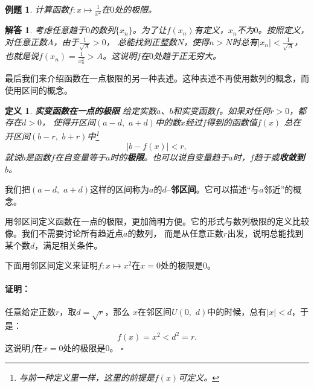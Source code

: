 \documentclass[12pt,UTF8]{ctexbook}
\newtheorem{df}{定义}[section]
\newtheorem{et}{例题}[section]
\newtheorem*{so}{解答}
\renewenvironment{proof}{\paragraph{\textbf{证明：}}}{\hfill$\square$}
\begin{document}
\begin{et}
    计算函数$f: x\mapsto \frac{1}{x^2}$在$0$处的极限。
\end{et}
\begin{so}
    考虑任意趋于$0$的数列$\{x_n\}$。为了让$f(x_n)$有定义，$x_n$不为$0$。按照定义，对任意正数$A$，由于$\frac{1}{\sqrt{A}} > 0$，
    总能找到正整数$N$，使得$n>N$时总有$|x_n| < \frac{1}{\sqrt{A}}$，也就是说$f(x_n) = \frac{1}{x_n^2} > A$。这说明$f$在$0$处趋于正无穷大。
\end{so}

最后我们来介绍函数在一点极限的另一种表述。这种表述不再使用数列的概念，而使用区间的概念。

\begin{df}\textbf{实变函数在一点的极限}
    给定实数$a$、$b$和实变函数$f$。如果对任何$r>0$，都存在$d>0$，
    使得开区间$(a-d,\,\,a+d)$中的数$x$经过$f$得到的函数值$f(x)$
    总在开区间$(b-r,\,\,b+r)$中\footnote{与前一种定义里一样，这里的前提是$f(x)$可定义。}
    $$ |b - f(x)| < r,$$
    就说$b$是函数$f$在自变量等于$a$时的\textbf{极限}。也可以说自变量趋于$a$时，$f$趋于或\textbf{收敛到} $b$。
\end{df}

我们把$(a-d,\,\,a+d)$这样的区间称为$a$的$d$–\textbf{邻区间}。它可以描述“与$a$邻近”的概念。

用邻区间定义函数在一点的极限，更加简明方便。它的形式与数列极限的定义比较像。我们不需要讨论所有趋近点$a$的数列，
而是从任意正数$r$出发，说明总能找到某个数$d$，满足相关条件。

下面用邻区间定义来证明$f:x\mapsto x^2$在$x=0$处的极限是$0$。
\begin{proof}
    任意给定正数$r$，取$d = \sqrt{r}$，那么
    $x$在邻区间$U(0,\,\, d)$中的时候，总有$|x| < d$，于是：
    $$f(x) = x^2 < d^2 = r.$$
    这说明$f$在$x=0$处的极限是$0$。
\end{proof}
\end{document}
